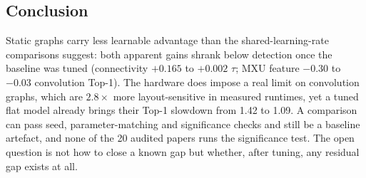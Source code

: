 \subsection{Conclusion}
Static graphs carry less learnable advantage than the shared-learning-rate comparisons suggest: both
apparent gains shrank below detection once the baseline was tuned (connectivity $+0.165$ to $+0.002$
$\tau$; MXU feature $-0.30$ to $-0.03$ convolution Top-1). The hardware does impose a real limit on
convolution graphs, which are $2.8\times$ more layout-sensitive in measured runtimes, yet a tuned flat
model already brings their Top-1 slowdown from 1.42 to 1.09. A comparison can pass seed,
parameter-matching and significance checks and still be a baseline artefact, and none of the 20 audited
papers runs the significance test. The open question is not how to close a known gap but whether, after
tuning, any residual gap exists at all.
